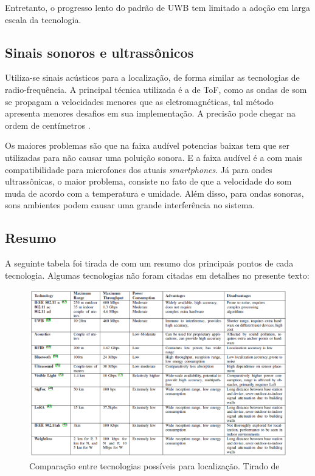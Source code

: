 Entretanto, o progresso lento do padrão de UWB tem limitado a adoção em larga escala da tecnologia.


\subsection{Sinais sonoros e ultrassônicos}

Utiliza-se sinais acústicos para a localização, de forma similar as tecnologias de radio-frequência.
A principal técnica utilizada é a de ToF, como as ondas de som se propagam a velocidades menores que as eletromagnéticas, tal método apresenta menores desafios em sua implementação. A precisão pode chegar na ordem de centímetros \cite{art11}.

Os maiores problemas são que na faixa audível potencias baixas tem que ser utilizadas para não causar uma poluição sonora. E a faixa audível é a com mais compatibilidade para microfones dos atuais \textit{smartphones}. Já para ondes ultrassônicas, o maior problema, consiste no fato de que a velocidade do som muda de acordo com a temperatura e umidade. Além disso, para ondas sonoras, sons ambientes podem causar uma grande interferência no sistema.


\subsection{Resumo}
A seguinte tabela foi tirada de \cite{art2} com um resumo dos principais pontos de cada tecnologia. Algumas tecnologias não foram citadas em detalhes no presente texto:

\begin{figure}[H]
	\centering 
	\includegraphics[scale = 0.7]{images/technologies_table.png}
	\caption{Comparação entre tecnologias possíveis para localização. Tirado de \cite{art2}}
	\label{fig:technologies_table}
\end{figure}
